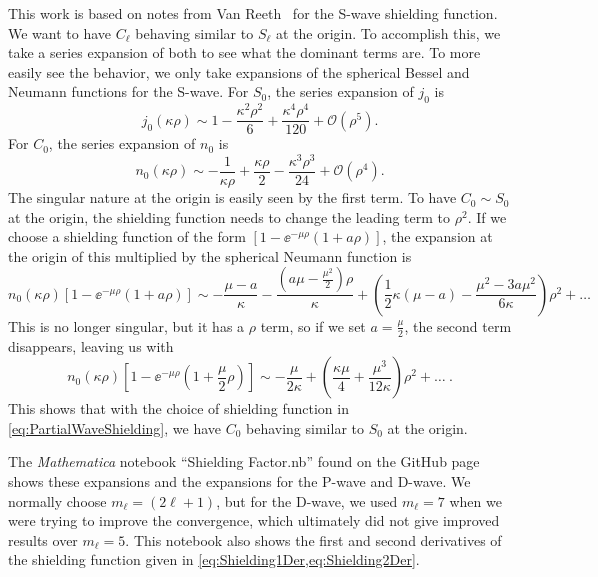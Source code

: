 \documentclass[Dissertation.tex]{subfiles}
\begin{document}
This work is based on notes from Van Reeth \cite{VanReethPrivate}\
for the S-wave shielding function.
We want to have $C_\ell$ behaving similar to $S_\ell$ at the origin. To
accomplish this, we take a series expansion of both to see what the dominant
terms are. To more easily see the behavior, we only take expansions of the
spherical Bessel and Neumann functions for the S-wave. For $S_0$, the series expansion of
$j_0$ is
\begin{equation}
j_0(\kappa\rho) \sim 1 - \frac{\kappa^2 \rho^2}{6} + \frac{\kappa^4 \rho^4}{120} + \mathcal{O}(\rho^5).
\end{equation}
For $C_0$, the series expansion of $n_0$ is
\begin{equation}
n_0(\kappa\rho) \sim -\frac{1}{\kappa\rho} + \frac{\kappa \rho}{2} - \frac{\kappa^3 \rho^3}{24} + \mathcal{O}(\rho^4).
\end{equation}
The singular nature at the origin is easily seen by the first term. To have
$C_0 \sim S_0$ at the origin, the shielding function needs to change the
leading term to $\rho^2$. If we choose a shielding function of the form
$\left[1 - \ee^{-\mu \rho} \left(1+a \rho\right)\right]$, the
expansion at the origin of this multiplied by the spherical Neumann function is
\begin{equation}
n_0(\kappa\rho) \left[1 - \ee^{-\mu \rho} \left(1+a \rho\right)\right] \sim
-\frac{\mu-a}{\kappa} - \frac{\left(a\mu - \frac{\mu^2}{2}\right)\rho}{\kappa}
+ \left(\frac{1}{2}\kappa(\mu-a) - \frac{\mu^2 - 3 a \mu^2}{6\kappa}\right) \rho^2 + \ldots
\end{equation}
This is no longer singular, but it has a $\rho$ term, so if we set
$a = \frac{\mu}{2}$, the second term disappears, leaving us with
\begin{equation}
n_0(\kappa\rho) \left[1 - \ee^{-\mu \rho} \left(1+\frac{\mu}{2}\rho\right)\right] \sim
-\frac{\mu}{2\kappa} + \left(\frac{\kappa\mu}{4} + \frac{\mu^3}{12\kappa}\right) \rho^2 + \ldots \ .
\end{equation}
This shows that with the choice of shielding function in \cref{eq:PartialWaveShielding},
we have $C_0$ behaving similar to $S_0$ at the origin.

The \emph{Mathematica} notebook ``Shielding Factor.nb'' found on the GitHub
page \cite{GitHub} shows these expansions and the expansions for the P-wave
and D-wave. We normally choose $m_\ell = (2\ell+1)$, but for the D-wave, we
used $m_\ell = 7$ when we were trying to improve the convergence, which
ultimately did not give improved results over $m_\ell = 5$. This notebook
also shows the first and second derivatives of the shielding function given
in \cref{eq:Shielding1Der,eq:Shielding2Der}.
\end{document}
